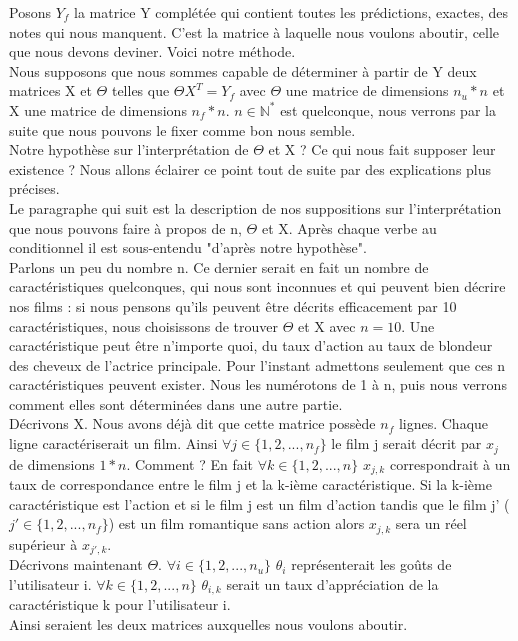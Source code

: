 \documentclass[a4paper,10pt]{article}
\begin{document}
Posons $Y_f$ la matrice Y complétée qui contient toutes les prédictions, exactes, des notes qui nous manquent. C'est la matrice à laquelle nous voulons aboutir, celle que nous devons deviner. Voici notre méthode.\\ 
 
Nous supposons que nous sommes capable de déterminer à partir de Y deux matrices X et $\Theta$ telles que $\Theta X^T = Y_f$ avec $\Theta$ une matrice de dimensions $n_u * n$ et X une matrice de dimensions $n_f * n$. $n \in \mathbb{N}^*$ est quelconque, nous verrons par la suite que nous pouvons le fixer comme bon nous semble.\\ 
Notre hypothèse sur l'interprétation de $\Theta$ et X ? Ce qui nous fait supposer leur existence ? Nous allons éclairer ce point tout de suite par des explications plus précises.\\

Le paragraphe qui suit est la description de nos suppositions sur l'interprétation que nous pouvons faire à propos de n, $\Theta$ et X. Après chaque verbe au conditionnel il est sous-entendu "d'après notre hypothèse".\\
Parlons un peu du nombre n. Ce dernier serait en fait un nombre de caractéristiques quelconques, qui nous sont inconnues et qui peuvent bien décrire nos films : si nous pensons qu'ils peuvent être décrits efficacement par 10 caractéristiques, nous choisissons de trouver $\Theta$ et X avec $n = 10$. 
Une caractéristique peut être n'importe quoi, du taux d'action au taux de blondeur des cheveux de l'actrice principale. Pour l'instant admettons seulement que ces n caractéristiques peuvent exister. Nous les numérotons de 1 à n, puis nous verrons comment elles sont déterminées dans une autre partie.\\
Décrivons X. Nous avons déjà dit que cette matrice possède $n_f$ lignes. Chaque ligne caractériserait un film. Ainsi $\forall j \in \{1, 2, ..., n_f\}$ le film j serait décrit par $x_j$ de dimensions $1 * n$. Comment ? En fait $\forall k \in \{1, 2, ..., n\}$ $x_{j,k}$ correspondrait à un taux de correspondance entre le film j et la k-ième caractéristique. Si la k-ième caractéristique est l'action et si le film j est un film d'action tandis que le film j' ($j' \in \{1, 2, ..., n_f\}$) est un film romantique sans action alors $x_{j,k}$ sera un réel supérieur à $x_{j',k}$.\\
Décrivons maintenant $\Theta$. $\forall i \in \{1, 2, ..., n_u\}$ $\theta_{i}$ représenterait les goûts de l'utilisateur i. $\forall k \in \{1, 2, ..., n\}$ $\theta_{i,k}$ serait un taux d'appréciation de la caractéristique k pour l'utilisateur i.\\
Ainsi seraient les deux matrices auxquelles nous voulons aboutir.\\
\end{document}
